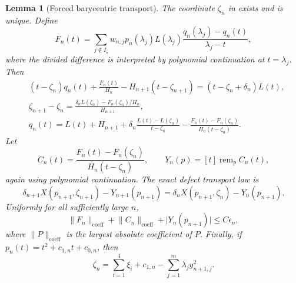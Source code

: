 \documentclass[11pt]{article}
\newtheorem{lemma}{Lemma}[section]
\begin{document}
\begin{lemma}[Forced barycentric transport]
\label{lem:forced-barycentric}
The coordinate \(\zeta_n\) in
 exists and is unique.  Define
\[
 F_n(t)=\sum_{j\notin I_\star}
 w_{n,j}p_n(\lambda_j)L(\lambda_j)
 \frac{q_n(\lambda_j)-q_n(t)}{\lambda_j-t},
\]
where the divided difference is interpreted by polynomial continuation at
\(t=\lambda_j\).  Then
\begin{align}
 &(t-\zeta_n)q_n(t)+\frac{F_n(t)}{H_n}
       -H_{n+1}(t-\zeta_{n+1})
   =(t-\zeta_n+\delta_n)L(t),
 \tag{19}
 \label{eq:full-polynomial-identity}\\
 &\zeta_{n+1}-\zeta_n
   =\frac{\delta_nL(\zeta_n)-F_n(\zeta_n)/H_n}{H_{n+1}},
 \tag{20}
 \label{eq:full-zeta-increment}\\
 &q_n(t)=L(t)+H_{n+1}
  +\delta_n\frac{L(t)-L(\zeta_n)}{t-\zeta_n}
  -\frac{F_n(t)-F_n(\zeta_n)}
         {H_n(t-\zeta_n)}.
 \tag{21}
 \label{eq:full-quartic-identity}
\end{align}
Let
\[
 C_n(t)=\frac{F_n(t)-F_n(\zeta_n)}
              {H_n(t-\zeta_n)},\qquad
 Y_n(p)=[t]\operatorname{rem}_{p}C_n(t),
\]
again using polynomial continuation.  The exact defect transport law is
\[
 \delta_{n+1}X(p_{n+1},\zeta_{n+1})-Y_{n+1}(p_{n+1})
 =
 \delta_nX(p_{n+1},\zeta_n)-Y_n(p_{n+1}).
\tag{22}\label{eq:full-defect-transport}
\]
Uniformly for all sufficiently large \(n\),
\[
 \lVert F_n\rVert_{\mathrm{coeff}}+
 \lVert C_n\rVert_{\mathrm{coeff}}+
 \lvert Y_n(p_{n+1})\rvert\leq C\epsilon_n,
\tag{23}\label{eq:forcing-coefficient-bound}
\]
where \(\lVert P\rVert_{\mathrm{coeff}}\) is the largest absolute
coefficient of \(P\).  Finally, if
\(p_n(t)=t^2+c_{1,n}t+c_{0,n}\), then
\[
 \zeta_n=\sum_{i=1}^4\xi_i+c_{1,n}
          -\sum_{j=1}^m\lambda_jy_{n+1,j}^2.
\tag{24}\label{eq:zeta-state-formula}
\]
\end{lemma}
\end{document}
